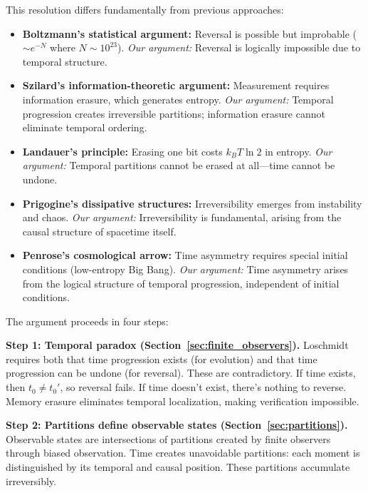\documentclass[twocolumn,10pt]{article}
\theoremstyle{definition}
\theoremstyle{remark}
\begin{document}
\vspace{0.2cm}
\noindent This resolution differs fundamentally from previous approaches:

\begin{itemize}
\item \textbf{Boltzmann's statistical argument\cite{boltzmann1877}:} Reversal is possible but improbable ($\sim e^{-N}$ where $N \sim 10^{23}$). \textit{Our argument:} Reversal is logically impossible due to temporal structure.

\item \textbf{Szilard's information-theoretic argument\cite{szilard1929}:} Measurement requires information erasure, which generates entropy. \textit{Our argument:} Temporal progression creates irreversible partitions; information erasure cannot eliminate temporal ordering.

\item \textbf{Landauer's principle\cite{landauer1961}:} Erasing one bit costs $k_B T \ln 2$ in entropy. \textit{Our argument:} Temporal partitions cannot be erased at all—time cannot be undone.

\item \textbf{Prigogine's dissipative structures\cite{prigogine1977}:} Irreversibility emerges from instability and chaos. \textit{Our argument:} Irreversibility is fundamental, arising from the causal structure of spacetime itself.

\item \textbf{Penrose's cosmological arrow\cite{penrose1989}:} Time asymmetry requires special initial conditions (low-entropy Big Bang). \textit{Our argument:} Time asymmetry arises from the logical structure of temporal progression, independent of initial conditions.
\end{itemize}

\vspace{0.2cm}
\noindent The argument proceeds in four steps:

\vspace{0.2cm}
\noindent\textbf{Step 1: Temporal paradox (Section~\ref{sec:finite_observers}).} Loschmidt requires both that time progression exists (for evolution) and that time progression can be undone (for reversal). These are contradictory. If time exists, then $t_0 \neq t_0'$, so reversal fails. If time doesn't exist, there's nothing to reverse. Memory erasure eliminates temporal localization, making verification impossible.

\vspace{0.2cm}
\noindent\textbf{Step 2: Partitions define observable states (Section~\ref{sec:partitions}).} Observable states are intersections of partitions created by finite observers through biased observation. Time creates unavoidable partitions: each moment is distinguished by its temporal and causal position. These partitions accumulate irreversibly.
\end{document}
